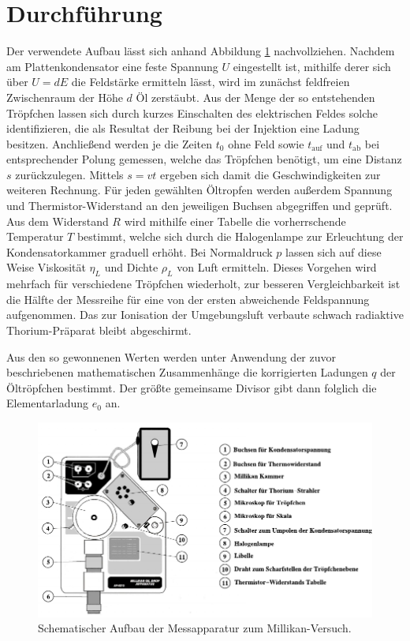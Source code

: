 \section{Durchführung}
\label{sec:durchführung}

Der verwendete Aufbau lässt sich anhand Abbildung \ref{fig:aufbau} nachvollziehen. Nachdem am Plattenkondensator eine feste Spannung $U$
eingestellt ist, mithilfe derer sich über $U = dE$ die Feldstärke ermitteln lässt, wird im zunächst feldfreien Zwischenraum der Höhe $d$
Öl zerstäubt. Aus der Menge der so entstehenden Tröpfchen lassen sich durch kurzes Einschalten des elektrischen Feldes solche identifizieren,
die als Resultat der Reibung bei der Injektion eine Ladung besitzen. Anchließend werden je die Zeiten $t_0$ ohne Feld sowie $t_\text{auf}$ und
$t_\text{ab}$ bei entsprechender Polung gemessen, welche das Tröpfchen benötigt, um eine Distanz $s$ zurückzulegen. Mittels $s = vt$ ergeben
sich damit die Geschwindigkeiten zur weiteren Rechnung. Für jeden gewählten Öltropfen werden außerdem Spannung und Thermistor-Widerstand
an den jeweiligen Buchsen abgegriffen und geprüft. Aus dem Widerstand $R$ wird mithilfe einer Tabelle die vorherrschende Temperatur $T$ bestimmt,
welche sich durch die Halogenlampe zur Erleuchtung der Kondensatorkammer graduell erhöht. Bei Normaldruck $p$ lassen sich auf diese Weise
Viskosität $\eta_L$ und Dichte $\rho_L$ von Luft ermitteln. Dieses Vorgehen wird mehrfach für verschiedene Tröpfchen wiederholt, zur besseren
Vergleichbarkeit ist die Hälfte der Messreihe für eine von der ersten abweichende Feldspannung aufgenommen. Das zur Ionisation der Umgebungsluft
verbaute schwach radiaktive Thorium-Präparat bleibt abgeschirmt.

Aus den so gewonnenen Werten werden unter Anwendung der zuvor beschriebenen mathematischen Zusammenhänge die korrigierten Ladungen $q$ der
Öltröpfchen bestimmt. Der größte gemeinsame Divisor gibt dann folglich die Elementarladung $e_0$ an.

\begin{figure}[H]
	\centering
	\includegraphics[width=0.95\linewidth]{content/grafik/aufbau.pdf}
	\caption{Schematischer Aufbau der Messapparatur zum Millikan-Versuch.}
	\label{fig:aufbau}
\end{figure}
